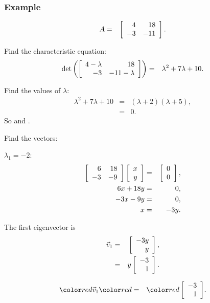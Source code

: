 \begin{frame}
  \frametitle{Example}

  \begin{eqnarray*}
    A & = & \left[ \begin{array}{rr} 4 & 18 \\ -3 & -11 \end{array} \right].
  \end{eqnarray*}

  Find the characteristic equation:
  \begin{eqnarray*}
    \det\left(\left[ \begin{array}{rr} 4-\lambda & 18 \\ -3 & -11-\lambda \end{array} \right]\right) & = & \lambda^2+7\lambda+10.
  \end{eqnarray*}

  Find the values of $\lambda$:
  \begin{eqnarray*}
    \lambda^2+7\lambda+10 & = & (\lambda+2)(\lambda+5), \\
    & = & 0.
  \end{eqnarray*}
  So  and .


\end{frame}


\begin{frame}
  Find the vectors:

  $\lambda_1 = -2$:
  \begin{eqnarray*}
    \left[ \begin{array}{rr} 6 & 18 \\ -3 & -9 \end{array} \right] \left[ \begin{array}{r} x \\ y \end{array} \right] & = & \left[ \begin{array}{r} 0 \\ 0 \end{array} \right], \\
    6x + 18y & = & 0, \\
    -3x - 9y & = & 0, \\
    x & = & -3y.
  \end{eqnarray*}

  The first eigenvector is 
  \begin{eqnarray*}
    \vec{v}_1 & = & \left[ \begin{array}{r} -3y \\ y \end{array} \right], \\
    & = & y \left[ \begin{array}{r} -3 \\ 1 \end{array} \right].
  \end{eqnarray*}

  \begin{eqnarray*}
    \redText{\vec{v}_1} & \redText{=} & \redText{\vecTwo{-3}{1}}.
  \end{eqnarray*}

\end{frame}

